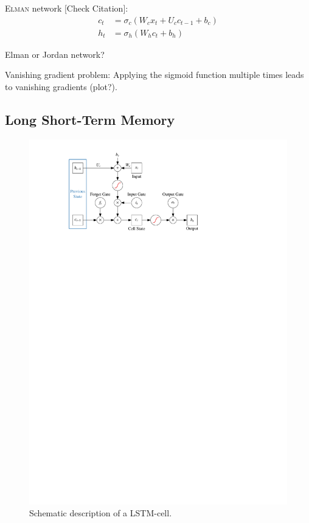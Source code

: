 \textsc{Elman} network [Check Citation]\cite{elman}:
\begin{align*}
  c_t &= \sigma_c(W_c x_t + U_c c_{t-1} + b_c) \\
  h_t &= \sigma_h(W_h c_t + b_h)
\end{align*}

Elman or Jordan network?

Vanishing gradient problem: Applying the sigmoid function multiple times leads
to vanishing gradients (plot?).

\subsection{Long Short-Term Memory}
\label{sec:lstm}

\begin{figure}[t]
  \centering
  \includegraphics{./figures/theory/LSTM.pdf}
  \caption{Schematic description of a LSTM-cell.}
  \label{fig:schematic_lstm}
\end{figure}

